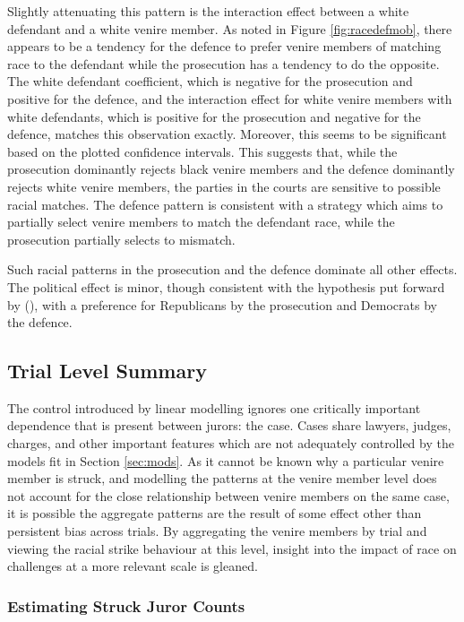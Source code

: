 Slightly attenuating this pattern is the interaction effect between a
white defendant and a white venire member. As noted in Figure
\ref{fig:racedefmob}, there appears to be a tendency for the defence to
prefer venire members of matching race to the defendant while the
prosecution has a tendency to do the opposite. The white defendant
coefficient, which is negative for the prosecution and positive for
the defence, and the interaction effect for white venire members with
white defendants, which is positive for the prosecution and negative
for the defence, matches this observation exactly. Moreover, this seems to be significant based on the plotted confidence
intervals. This suggests that, while the prosecution dominantly rejects black venire
members and the defence dominantly rejects white venire members, the
parties in the courts are sensitive to possible racial matches. The defence
pattern is consistent with a strategy which aims to partially select
venire members to match the defendant race, while the prosecution
partially selects to mismatch.

Such racial patterns in the prosecution and the defence dominate all other effects. The political effect is minor, though
consistent with the hypothesis put forward by (\cite{revesz2016}), with a preference for Republicans by the prosecution and Democrats by the defence.

\subsection{Trial Level Summary} \label{sec:casesum}

The control introduced by linear modelling ignores one critically important dependence that is present between jurors: the case. Cases share lawyers, judges, charges, and other important features which are not adequately controlled by the models fit in Section \ref{sec:mods}.  As it cannot be known why a particular venire member is struck, and modelling the patterns at the venire member level does not account for the close relationship between venire members on the same case, it is possible the aggregate patterns are the result
of some effect other than persistent bias across trials. By
aggregating the venire members by trial and viewing the racial strike
behaviour at this level, insight into the impact of race on challenges at a more relevant scale is gleaned.

\subsubsection{Estimating Struck Juror Counts} \label{subsec:struckjur}

